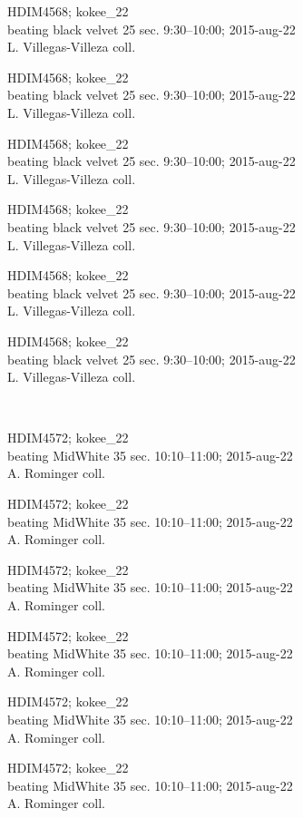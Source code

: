 \documentclass[2pt]{extarticle}
\begin{document}
\noindent
\parbox{0.16\textwidth}{\tiny \raggedright \rule[-0.3\baselineskip]{0pt}{10pt}HDIM4568; kokee\_22\\ beating black velvet 25 sec. 9:30--10:00; 2015-aug-22\\ L. Villegas-Villeza coll.}
\parbox{0.16\textwidth}{\tiny \raggedright \rule[-0.3\baselineskip]{0pt}{10pt}HDIM4568; kokee\_22\\ beating black velvet 25 sec. 9:30--10:00; 2015-aug-22\\ L. Villegas-Villeza coll.}
\parbox{0.16\textwidth}{\tiny \raggedright \rule[-0.3\baselineskip]{0pt}{10pt}HDIM4568; kokee\_22\\ beating black velvet 25 sec. 9:30--10:00; 2015-aug-22\\ L. Villegas-Villeza coll.}
\parbox{0.16\textwidth}{\tiny \raggedright \rule[-0.3\baselineskip]{0pt}{10pt}HDIM4568; kokee\_22\\ beating black velvet 25 sec. 9:30--10:00; 2015-aug-22\\ L. Villegas-Villeza coll.}
\parbox{0.16\textwidth}{\tiny \raggedright \rule[-0.3\baselineskip]{0pt}{10pt}HDIM4568; kokee\_22\\ beating black velvet 25 sec. 9:30--10:00; 2015-aug-22\\ L. Villegas-Villeza coll.}
\parbox{0.16\textwidth}{\tiny \raggedright \rule[-0.3\baselineskip]{0pt}{10pt}HDIM4568; kokee\_22\\ beating black velvet 25 sec. 9:30--10:00; 2015-aug-22\\ L. Villegas-Villeza coll.} \\ 
\vspace{0.001in} 

\noindent
\parbox{0.16\textwidth}{\tiny \raggedright \rule[-0.3\baselineskip]{0pt}{10pt}HDIM4572; kokee\_22\\ beating MidWhite 35 sec. 10:10--11:00; 2015-aug-22\\ A. Rominger coll.}
\parbox{0.16\textwidth}{\tiny \raggedright \rule[-0.3\baselineskip]{0pt}{10pt}HDIM4572; kokee\_22\\ beating MidWhite 35 sec. 10:10--11:00; 2015-aug-22\\ A. Rominger coll.}
\parbox{0.16\textwidth}{\tiny \raggedright \rule[-0.3\baselineskip]{0pt}{10pt}HDIM4572; kokee\_22\\ beating MidWhite 35 sec. 10:10--11:00; 2015-aug-22\\ A. Rominger coll.}
\parbox{0.16\textwidth}{\tiny \raggedright \rule[-0.3\baselineskip]{0pt}{10pt}HDIM4572; kokee\_22\\ beating MidWhite 35 sec. 10:10--11:00; 2015-aug-22\\ A. Rominger coll.}
\parbox{0.16\textwidth}{\tiny \raggedright \rule[-0.3\baselineskip]{0pt}{10pt}HDIM4572; kokee\_22\\ beating MidWhite 35 sec. 10:10--11:00; 2015-aug-22\\ A. Rominger coll.}
\parbox{0.16\textwidth}{\tiny \raggedright \rule[-0.3\baselineskip]{0pt}{10pt}HDIM4572; kokee\_22\\ beating MidWhite 35 sec. 10:10--11:00; 2015-aug-22\\ A. Rominger coll.} \\ 
\vspace{0.001in} 
\end{document}
